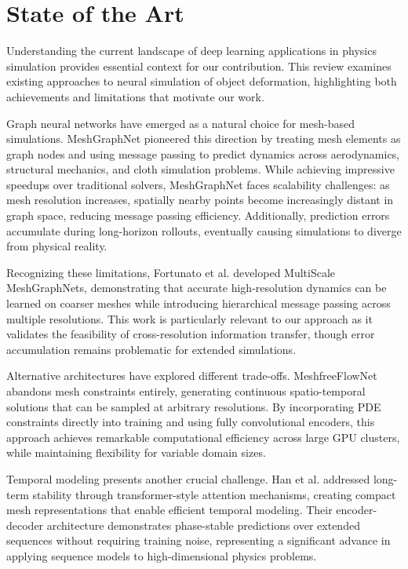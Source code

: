 \section*{State of the Art}

Understanding the current landscape of deep learning applications in physics simulation provides essential context for our contribution. This review examines existing approaches to neural simulation of object deformation, highlighting both achievements and limitations that motivate our work.

Graph neural networks have emerged as a natural choice for mesh-based simulations. MeshGraphNet \cite{pfaffLearningMeshBasedSimulation2021a} pioneered this direction by treating mesh elements as graph nodes and using message passing to predict dynamics across aerodynamics, structural mechanics, and cloth simulation problems. While achieving impressive speedups over traditional solvers, MeshGraphNet faces scalability challenges: as mesh resolution increases, spatially nearby points become increasingly distant in graph space, reducing message passing efficiency. Additionally, prediction errors accumulate during long-horizon rollouts, eventually causing simulations to diverge from physical reality.

Recognizing these limitations, Fortunato et al. \cite{fortunatoMultiScaleMeshGraphNets2022} developed MultiScale MeshGraphNets, demonstrating that accurate high-resolution dynamics can be learned on coarser meshes while introducing hierarchical message passing across multiple resolutions. This work is particularly relevant to our approach as it validates the feasibility of cross-resolution information transfer, though error accumulation remains problematic for extended simulations.

Alternative architectures have explored different trade-offs. MeshfreeFlowNet \cite{jiangMeshfreeFlowNetPhysicsConstrainedDeep2020} abandons mesh constraints entirely, generating continuous spatio-temporal solutions that can be sampled at arbitrary resolutions. By incorporating PDE constraints directly into training and using fully convolutional encoders, this approach achieves remarkable computational efficiency across large GPU clusters, while maintaining flexibility for variable domain sizes.

Temporal modeling presents another crucial challenge. Han et al. \cite{hanPredictingPhysicsMeshreduced2022a} addressed long-term stability through transformer-style attention mechanisms, creating compact mesh representations that enable efficient temporal modeling. Their encoder-decoder architecture demonstrates phase-stable predictions over extended sequences without requiring training noise, representing a significant advance in applying sequence models to high-dimensional physics problems.

